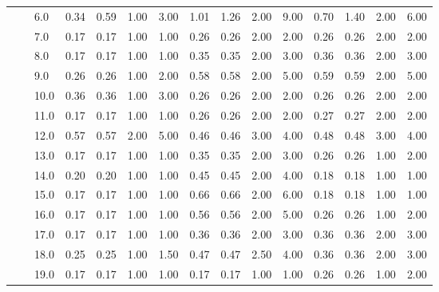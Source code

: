 \begin{tabular}{lllrrrrrrrrrrrr}
       &     & 6.0  &       0.34 &      0.59 & 1.00 &   3.00 &       1.01 &      1.26 &  2.00 &   9.00 &       0.70 &      1.40 &  2.00 &   6.00 \\
       &     & 7.0  &       0.17 &      0.17 & 1.00 &   1.00 &       0.26 &      0.26 &  2.00 &   2.00 &       0.26 &      0.26 &  2.00 &   2.00 \\
       &     & 8.0  &       0.17 &      0.17 & 1.00 &   1.00 &       0.35 &      0.35 &  2.00 &   3.00 &       0.36 &      0.36 &  2.00 &   3.00 \\
       &     & 9.0  &       0.26 &      0.26 & 1.00 &   2.00 &       0.58 &      0.58 &  2.00 &   5.00 &       0.59 &      0.59 &  2.00 &   5.00 \\
       &     & 10.0 &       0.36 &      0.36 & 1.00 &   3.00 &       0.26 &      0.26 &  2.00 &   2.00 &       0.26 &      0.26 &  2.00 &   2.00 \\
       &     & 11.0 &       0.17 &      0.17 & 1.00 &   1.00 &       0.26 &      0.26 &  2.00 &   2.00 &       0.27 &      0.27 &  2.00 &   2.00 \\
       &     & 12.0 &       0.57 &      0.57 & 2.00 &   5.00 &       0.46 &      0.46 &  3.00 &   4.00 &       0.48 &      0.48 &  3.00 &   4.00 \\
       &     & 13.0 &       0.17 &      0.17 & 1.00 &   1.00 &       0.35 &      0.35 &  2.00 &   3.00 &       0.26 &      0.26 &  1.00 &   2.00 \\
       &     & 14.0 &       0.20 &      0.20 & 1.00 &   1.00 &       0.45 &      0.45 &  2.00 &   4.00 &       0.18 &      0.18 &  1.00 &   1.00 \\
       &     & 15.0 &       0.17 &      0.17 & 1.00 &   1.00 &       0.66 &      0.66 &  2.00 &   6.00 &       0.18 &      0.18 &  1.00 &   1.00 \\
       &     & 16.0 &       0.17 &      0.17 & 1.00 &   1.00 &       0.56 &      0.56 &  2.00 &   5.00 &       0.26 &      0.26 &  1.00 &   2.00 \\
       &     & 17.0 &       0.17 &      0.17 & 1.00 &   1.00 &       0.36 &      0.36 &  2.00 &   3.00 &       0.36 &      0.36 &  2.00 &   3.00 \\
       &     & 18.0 &       0.25 &      0.25 & 1.00 &   1.50 &       0.47 &      0.47 &  2.50 &   4.00 &       0.36 &      0.36 &  2.00 &   3.00 \\
       &     & 19.0 &       0.17 &      0.17 & 1.00 &   1.00 &       0.17 &      0.17 &  1.00 &   1.00 &       0.26 &      0.26 &  1.00 &   2.00 \\

\end{tabular}
